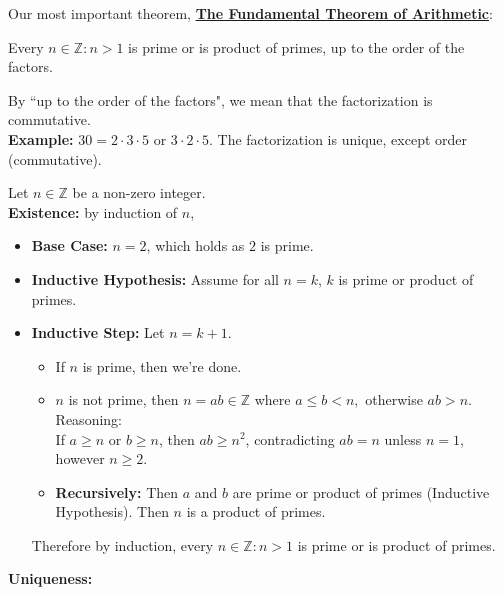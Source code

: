 \newpage

\noindent
Our most important theorem, \underline{\textbf{The Fundamental Theorem of Arithmetic}}:

\begin{theo}

    \label{theo:FTA}

    Every $n\in\mathbb{Z}:n>1$ is prime or is product of primes, up to the order of the factors.
\end{theo}
By ``up to the order of the factors", we mean that the factorization is commutative.\\
\textbf{Example:} $30=2\cdot3\cdot5$ or $3\cdot2\cdot5$. The factorization is unique, except order (commutative).\\

\begin{Proof}

    Let $n\in\mathbb{Z}$ be a non-zero integer.\\

    \noindent
    \textbf{Existence:} by induction of $n$,
    \begin{itemize}
        \item \textbf{Base Case:} $n=2$, which holds as $2$ is prime.
        \item \textbf{Inductive Hypothesis:} Assume for all $n=k$, $k$ is prime or product of primes.
        \item \textbf{Inductive Step:} Let $n=k+1$. 
        \begin{itemize}
            \item If $n$ is prime, then we're done.
            \item $n$ is not prime, then $n=ab\in\mathbb{Z}$ where $a\leq b<n,$ otherwise $ab>n$. Reasoning:\\
                    If \( a \geq n \) or \( b \geq n \), then \( ab \geq n^2 \), contradicting \( ab = n \) unless \( n = 1 \), however \( n \geq 2 \).
            \item \textbf{Recursively:} Then $a$ and $b$ are prime or product of primes (Inductive Hypothesis). Then $n$ is a product of primes.
        \end{itemize}
        Therefore by induction, every $n\in\mathbb{Z}:n>1$ is prime or is product of primes.
    \end{itemize}
    
    \noindent
    \textbf{Uniqueness:}
\end{Proof}